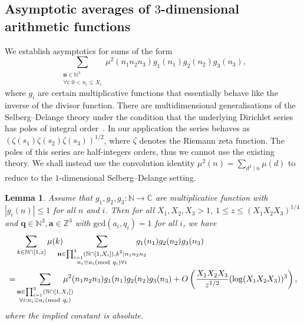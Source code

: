 \documentclass[a4paper,12pt,reqno]{amsart}
\numberwithin{equation}{section} \numberwithin{figure}{section}
\newcommand\Z{\mathbb{Z}}
\newcommand\N{\mathbb{N}}
\newcommand{\md}[1]{  \left(\textnormal{mod}\ #1\right)}
\renewcommand{\l}{\left}
\renewcommand{\r}{\right}
\renewcommand{\b}{\mathbf}
\renewcommand{\gcd}{\textrm{gcd}}
\renewcommand{\leq}{\leqslant}
\renewcommand{\#}{\sharp}
\newtheorem{lemma}{Lemma}
\theoremstyle{definition}
\numberwithin{lemma}{section}
\begin{document}
\subsection{Asymptotic averages of $3$-dimensional arithmetic functions} \label{s:preparatory}
We establish asymptotics for sums of the form  
$$
\sum_{\substack{ \b n \in \N^3  \\ \forall i : 0<n_i \leq X_i  }} \mu^2(n_1n_2n_3) g_1(n_1)  g_2(n_2)  g_3(n_3) 
,$$ where $g_i $ are certain multiplicative functions that essentially behave like the inverse of the divisor function.
There are multidimensional generalisations of the Selberg--Delange theory
 under the condition that the underlying   
Dirichlet series    has poles of    integral  order~\cite{MR1858338}. In our   application the series   behaves as  $(\zeta(s_1)\zeta(s_2)\zeta(s_3) )^{1/2}$, 
where $\zeta$ denotes the Riemann zeta function. 
The poles of this series   are half-integers orders, thus we cannot use the existing theory.
We shall instead   use the convolution identity $\mu^2(n)=\sum_{d^2\mid n }\mu(d) $ to
reduce  to the   $1$-dimensional Selberg--Delange setting.
  \begin{lemma}
\label{lem:bwv225hcab}Assume that $g_1,g_2,g_3:\N\to \mathbb C$ are multiplicative function with $|g_i(n)| \leq 1 $ for all $n$ and $i$.
Then for all $X_1,X_2,X_3>1$, $1\leq z\leq (X_1X_2X_3)^{1/4} $ and $\b q \in \N^3, \b a \in \Z^3$ with $\gcd(a_i,q_i)=1$ for all $i$, 
we have 
\begin{align*}
&\sum_{\substack{ k\in \N \cap [1,z]  } } \mu(k)\hspace{-0,3cm}
\sum_{\substack{ \b n \in \prod_{i=1}^3 (\N \cap [1,X_i] ), k^2\mid n_1n_2n_3   \\n_i\equiv a_i \md {q_i} \forall i  } }
\hspace{-0,5cm} g_1(n_1)g_2(n_2)g_3(n_3) 
\\
=&\sum_{\substack{ \b n \in \prod_{i=1}^3 (\N\cap[1,X_i])\\ \forall i : n_i\equiv a_i \md{q_i } } } 
\hspace{-0,5cm}
\mu^2(n_1n_2n_3) g_1(n_1)g_2(n_2)g_3(n_3) 
+O\l(\frac{X_1X_2X_3}{z^{1/2} }(\log (X_1X_2X_3) )^3\r),
\end{align*} where the implied constant     is absolute.\end{lemma}
\end{document}
